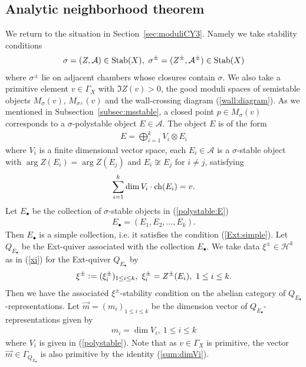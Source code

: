 \documentclass[11pt]{amsart}
\theoremstyle{plain}
\theoremstyle{definition}
\theoremstyle{remark}
\newcommand{\aA}{\mathcal{A}}
\newcommand{\hH}{\mathcal{H}}
\newcommand{\ch}{\mathop{\rm ch}\nolimits}
\newcommand{\Stab}{\mathop{\rm Stab}\nolimits}
\begin{document}
\subsection{Analytic neighborhood theorem}
We return to the situation in 
Section~\ref{sec:moduliCY3}. 
Namely we take
stability conditions
\begin{align}\label{take:stab}
\sigma=(Z, \aA) \in \Stab(X), \ 
\sigma^{\pm}=(Z^{\pm}, \aA^{\pm}) \in \Stab(X)
\end{align}
where 
$\sigma^{\pm}$ lie on adjacent chambers
whose closures contain $\sigma$.  
We also take 
a primitive element $v \in \Gamma_X$
with $\Im Z(v)>0$, 
the good moduli spaces of
semistable objects
$M_{\sigma}(v)$, $M_{\sigma^{\pm}}(v)$
and  
the wall-crossing diagram 
(\ref{wall:diagram}). 
As we mentioned in Subsection~\ref{subsec:msstable}, a 
closed point $p \in M_{\sigma}(v)$ corresponds to a 
$\sigma$-polystable object
$E \in \aA$. 
 The object $E$ is of the form
\begin{align}\label{polystable:E}
E=
\bigoplus_{i=1}^k V_i \otimes E_i
\end{align}
where $V_i$ is a finite dimensional vector space, each 
$E_i \in \aA$ is a $\sigma$-stable object
with $\arg Z(E_i)=\arg Z(E_j)$
and
$E_i \not\cong E_j$ for $i\neq j$, 
satisfying 
\begin{align}\label{sum:dimVi}
\sum_{i=1}^k \dim V_i \cdot \ch(E_i)=v.
\end{align}
Let $E_{\bullet}$ be the collection of 
$\sigma$-stable objects in (\ref{polystable:E})
\begin{align}\label{collect:poly}
E_{\bullet}=(E_1, E_2, \ldots, E_k).
\end{align}
Then $E_{\bullet}$ is a simple collection, i.e. 
it satisfies the condition (\ref{Ext:simple}). 
Let $Q_{E_{\bullet}}$ be the Ext-quiver
associated with the collection $E_{\bullet}$. 
We take data $\xi^{\pm} \in \hH^{k}$ as in 
(\ref{xi}) for the 
Ext-quiver $Q_{E_{\bullet}}$ by 
\begin{align}\label{xi+}
\xi^{\pm} \cneq (\xi^{\pm}_i)_{1\le i\le k}, \ 
\xi^{\pm}_i = Z^{\pm}(E_i), \ 1\le i\le k. 
\end{align}
Then we have the associated 
$\xi^{\pm}$-stability condition on
the abelian category of 
$Q_{E_{\bullet}}$-representations. 
Let $\vec{m}=(m_i)_{1\le i\le k}$ be the dimension vector of $Q_{E_{\bullet}}$-representations given by
\begin{align}\label{dimvec:m}
m_i=\dim V_i, \ 1\le i\le k
\end{align}
where $V_i$ is given in (\ref{polystable}). 
Note that 
as $v \in \Gamma_X$ is primitive, 
the vector $\vec{m} \in \Gamma_{Q_{E_{\bullet}}}$ is 
also primitive by the identity (\ref{sum:dimVi}). 
\end{document}
